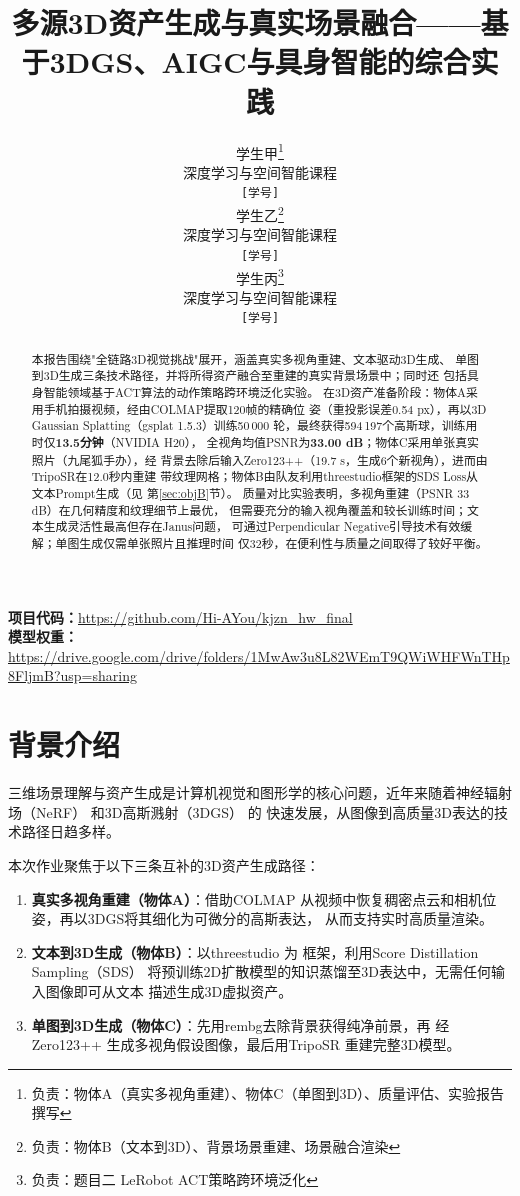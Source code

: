 \documentclass{article}
\title{多源3D资产生成与真实场景融合——基于3DGS、AIGC与具身智能的综合实践}
\author{%
  学生甲\thanks{负责：物体A（真实多视角重建）、物体C（单图到3D）、质量评估、实验报告撰写} \\
  深度学习与空间智能课程\\
  \texttt{[学号]} \\
  \And
  学生乙\thanks{负责：物体B（文本到3D）、背景场景重建、场景融合渲染} \\
  深度学习与空间智能课程\\
  \texttt{[学号]} \\
  \And
  学生丙\thanks{负责：题目二 LeRobot ACT策略跨环境泛化} \\
  深度学习与空间智能课程\\
  \texttt{[学号]} \\
}
\begin{document}
\maketitle

\begin{abstract}
本报告围绕"全链路3D视觉挑战"展开，涵盖真实多视角重建、文本驱动3D生成、
单图到3D生成三条技术路径，并将所得资产融合至重建的真实背景场景中；同时还
包括具身智能领域基于ACT算法的动作策略跨环境泛化实验。
在3D资产准备阶段：物体A采用手机拍摄视频，经由COLMAP提取120帧的精确位
姿（重投影误差0.54 px），再以3D Gaussian Splatting（gsplat 1.5.3）训练50\,000
轮，最终获得594\,197个高斯球，训练用时仅\textbf{13.5分钟}（NVIDIA H20），
全视角均值PSNR为\textbf{33.00 dB}；物体C采用单张真实照片（九尾狐手办），经
背景去除后输入Zero123++（19.7 s，生成6个新视角），进而由TripoSR在12.0秒内重建
带纹理网格；物体B由队友利用threestudio框架的SDS Loss从文本Prompt生成（见
第\ref{sec:objB}节）。
质量对比实验表明，多视角重建（PSNR 33 dB）在几何精度和纹理细节上最优，
但需要充分的输入视角覆盖和较长训练时间；文本生成灵活性最高但存在Janus问题，
可通过Perpendicular Negative引导技术有效缓解；单图生成仅需单张照片且推理时间
仅32秒，在便利性与质量之间取得了较好平衡。
\end{abstract}

\noindent\textbf{项目代码：}\url{https://github.com/Hi-AYou/kjzn_hw_final}\\
\textbf{模型权重：}\url{https://drive.google.com/drive/folders/1MwAw3u8L82WEmT9QWiWHFWnTHp8FljmB?usp=sharing}

\tableofcontents
\newpage

\section{背景介绍}
\label{sec:intro}

三维场景理解与资产生成是计算机视觉和图形学的核心问题，近年来随着神经辐射
场（NeRF）\cite{mildenhall2020nerf} 和3D高斯溅射（3DGS）\cite{kerbl20233d} 的
快速发展，从图像到高质量3D表达的技术路径日趋多样。

本次作业聚焦于以下三条互补的3D资产生成路径：
\begin{enumerate}
  \item \textbf{真实多视角重建（物体A）}：借助COLMAP \cite{schoenberger2016sfm}
        从视频中恢复稠密点云和相机位姿，再以3DGS将其细化为可微分的高斯表达，
        从而支持实时高质量渲染。
  \item \textbf{文本到3D生成（物体B）}：以threestudio \cite{threestudio2023} 为
        框架，利用Score Distillation Sampling（SDS）\cite{poole2022dreamfusion}
        将预训练2D扩散模型的知识蒸馏至3D表达中，无需任何输入图像即可从文本
        描述生成3D虚拟资产。
  \item \textbf{单图到3D生成（物体C）}：先用rembg去除背景获得纯净前景，再
        经Zero123++ \cite{liu2023zero} 生成多视角假设图像，最后用TripoSR
        \cite{tochilkin2024triposr}重建完整3D模型。
\end{enumerate}
\end{document}
